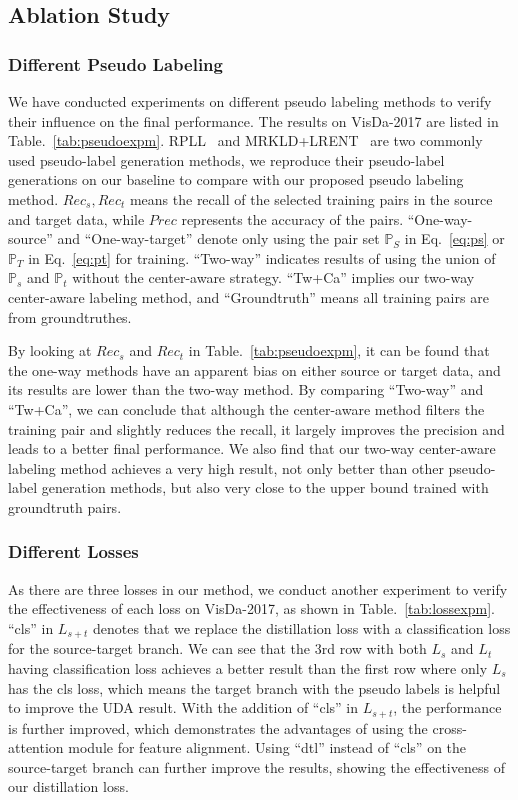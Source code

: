 \documentclass[dvipsnames, svgnames, x11names, table]{article} \usepackage{iclr2022_conference,times}
\def\sP{{\mathbb{P}}}
\begin{document}
\begin{spacing}{1.0}
\subsection{Ablation Study}


\subsubsection{Different Pseudo Labeling}
We have conducted experiments on different pseudo labeling methods to verify their influence on the final performance.
The results on VisDa-2017 are listed in Table.~\ref{tab:pseudoexpm}.
RPLL~\citep{zheng2021rectifying} and MRKLD+LRENT~\citep{zou2019confidence} are two commonly used pseudo-label generation methods, we reproduce their pseudo-label generations on our baseline to compare with our proposed pseudo labeling method.
$Rec_s,Rec_t$ means the recall of the selected training pairs in the source and target data, while $Prec$ represents the accuracy of the pairs. 
``One-way-source'' and ``One-way-target'' denote only using the pair set $\sP_S$ in Eq.~\ref{eq:ps} or $\sP_T$ in Eq.~\ref{eq:pt} for training. ``Two-way'' indicates results of using the union of $\sP_s$ and $\sP_t$ without the center-aware strategy. ``Tw+Ca'' implies our two-way center-aware labeling method, and
``Groundtruth'' means all training pairs are from groundtruthes.

By looking at $Rec_s$ and $Rec_t$ in Table.~\ref{tab:pseudoexpm}, it can be found that the one-way methods have an apparent bias on either source or target data, and its results are lower than the two-way method. By comparing ``Two-way'' and ``Tw+Ca'', we can conclude that although the center-aware method filters the training pair and slightly reduces the recall, it largely improves the precision and leads to a better final performance. We also find that our two-way center-aware labeling method achieves a very high result, not only better than other pseudo-label generation methods, but also very close to the upper bound trained with groundtruth pairs.

\subsubsection{Different Losses}
As there are three losses in our method, we conduct another experiment to verify the effectiveness of each loss on VisDa-2017, as shown in Table.~\ref{tab:lossexpm}. 
``cls'' in $L_{s+t}$ denotes that we replace the distillation loss with a classification loss for the source-target branch.
We can see that the 3rd row with both $L_s$ and $L_t$ having classification loss achieves a better result than the first row where only $L_s$ has the cls loss, which means the target branch with the pseudo labels is helpful to improve the UDA result. With the addition of ``cls'' in $L_{s+t}$, the performance is further improved, which demonstrates the advantages of using the cross-attention module for feature alignment. Using ``dtl'' instead of ``cls'' on the source-target branch can further improve the results, showing the effectiveness of our distillation loss.


\end{spacing}
\end{document}
